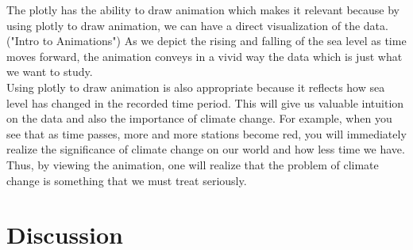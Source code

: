 \documentclass[fontsize=11pt]{article}
\begin{document}
    The plotly has the ability to draw animation which makes it relevant because by using plotly to draw animation, we can have a direct visualization of the data. ("Intro to Animations") As we depict the rising and falling of the sea level as time moves forward, the animation conveys in a vivid way the data which is just what we want to study. \\
    Using plotly to draw animation is also appropriate because it reflects how sea level has changed in the recorded time period. This will give us valuable intuition on the data and also the importance of climate change. For example, when you see that as time passes, more and more stations become red, you will immediately realize the significance of climate change on our world and how less time we have. Thus, by viewing the animation, one will realize that the problem of climate change is something that we must treat seriously.


    \section*{Discussion}
\end{document}
